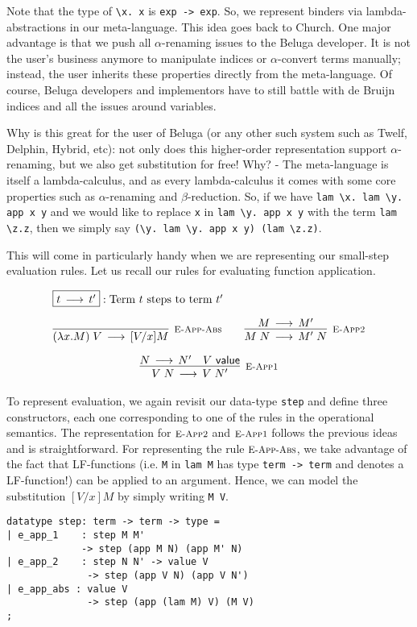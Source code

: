 Note that the type of \lstinline!\x. x! is \lstinline!exp -> exp!. So,
we represent binders  via lambda-abstractions in our
meta-language. This idea goes back to Church. One major advantage is
that we push all $\alpha$-renaming issues to the Beluga developer. It
is not the user's business anymore to manipulate indices or
$\alpha$-convert terms manually; instead, the user inherits these
properties directly from the meta-language. Of course, Beluga developers and
implementors have to still battle with de Bruijn indices and all the issues
around variables.

Why is this great for the user of Beluga (or any other such system such as Twelf, Delphin, Hybrid, etc): not only does this higher-order representation support $\alpha$-renaming, but we also get substitution for free! Why?  - The meta-language is itself a lambda-calculus, and as every lambda-calculus it comes with some core properties such as $\alpha$-renaming and $\beta$-reduction. So, if we
have \lstinline!lam \x. lam \y. app x y! and we would like to replace
\lstinline!x! in \lstinline!lam \y. app x y! with the term
\lstinline!lam \z.z!, then we simply say
\lstinline!(\y. lam \y. app x y) (lam \z.z)!.

This will come in particularly handy when we are representing our small-step
evaluation rules. Let us recall our rules for evaluating function application.

\[
\begin{array}{c}
\multicolumn{1}{l}{\fbox{$t \Steps t'$}: \mbox{Term $t$ steps to term $t'$}}
\\[1em]
\infer[\EAppBeta]{(\lam x.M) \app V \Steps [V/x]M}{} \qquad
\infer[\EAppArgStep]{M \app N \Steps M'\;N}{M \Steps M'} \\[1em]
\infer[\EAppFnStep]{V \app N \Steps V\;N'}{N \Steps N' & V \Value}
\end{array}
\]

To represent evaluation, we again revisit our data-type
\lstinline!step! and define three constructors, each one corresponding to one of
the rules in the operational semantics. The representation for $\textsc{\footnotesize E-App2}$
and $\textsc{\footnotesize E-App1}$ follows the previous ideas and is straightforward. For
representing the rule $\textsc{\footnotesize E-App-Abs}$, we take advantage of the fact that
LF-functions (i.e. \lstinline!M! in \lstinline!lam M! has type
\lstinline!term -> term! and denotes a LF-function!) can be applied to an
argument. Hence, we can model the substitution $[V/x]M$ by simply writing
\lstinline!M V!.

\begin{lstlisting}
datatype step: term -> term -> type =
| e_app_1    : step M M'
             -> step (app M N) (app M' N)
| e_app_2    : step N N' -> value V
              -> step (app V N) (app V N')
| e_app_abs : value V
              -> step (app (lam M) V) (M V)
;
\end{lstlisting}


